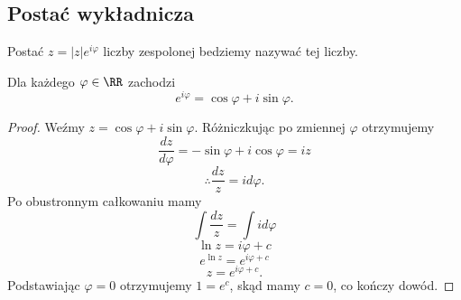 \subsection{Postać wykładnicza}
Postać $z = |z|e^{i\varphi}$ liczby zespolonej bedziemy nazywać  tej liczby.
\begin{theorem}
    Dla każdego $\varphi \in \RR$ zachodzi
    $$ e^{i\varphi} = \cos\varphi + i\sin\varphi. $$
\end{theorem}
\begin{proof}
    Weźmy $z = \cos\varphi + i\sin\varphi$. Różniczkując po zmiennej $\varphi$ otrzymujemy
    $$ \frac{dz}{d\varphi} = -\sin\varphi + i\cos\varphi = iz $$
    $$ \therefore \frac{dz}{z} = id\varphi. $$
    Po obustronnym całkowaniu mamy
    $$ \int\frac{dz}{z} = \int id\varphi $$
    $$ \ln{z} = i\varphi + c $$
    $$ e^{\ln{z}} = e^{i\varphi + c} $$
    $$ z = e^{i\varphi + c}. $$
    Podstawiając $\varphi = 0$ otrzymujemy $1 = e^c$, skąd mamy $c = 0$, co kończy dowód.
\end{proof}